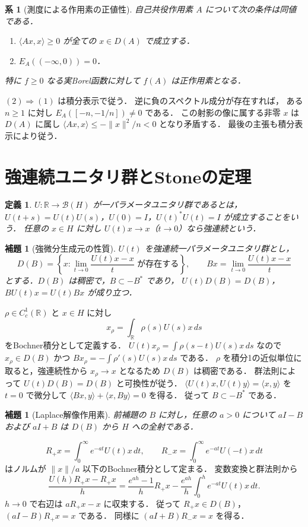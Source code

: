 \documentclass[a5paper,10pt,onecolumn]{jsarticle}
\makeatletter
\theoremstyle{mathnotetheorem}
\newtheorem{definition}[theorem]{定義}
\newtheorem{lemma}[theorem]{補題}
\newtheorem{corollary}[theorem]{系}
\renewcommand{\proofname}{証明}
\renewenvironment{proof}[1][\proofname]{%
  \par\pushQED{\qed}\normalfont\topsep4\p@\@plus2\p@\relax
  \trivlist\item[\hskip\labelsep\bfseries #1]\ignorespaces
}{\popQED\endtrivlist\@endpefalse}
\newcommand{\norm}[1]{\lVert #1\rVert}
\makeatother
\begin{document}
\begin{corollary}[測度による作用素の正値性]
自己共役作用素 $A$ について次の条件は同値である．
\begin{enumerate}
 \item $\langle Ax,x\rangle\ge0$ が全ての $x\in D(A)$ で成立する．
 \item $E_A(( -\infty,0))=0$．
\end{enumerate}
特に $f\ge0$ なる実Borel函数に対して $f(A)$ は正作用素となる．
\end{corollary}
\begin{proof}
$(2)\Rightarrow(1)$ は積分表示で従う．
逆に負のスペクトル成分が存在すれば，
ある $n\ge1$ に対し $E_A([-n,-1/n])\ne0$ である．
この射影の像に属する非零 $x$ は $D(A)$ に属し
$\langle Ax,x\rangle\le-\norm x^2/n<0$ となり矛盾する．
最後の主張も積分表示により従う．
\end{proof}

\section{強連続ユニタリ群とStoneの定理}
\begin{definition}
$U:\mathbb R\to\mathcal B(H)$ が一パラメータユニタリ群であるとは，
$U(t+s)=U(t)U(s)$，$U(0)=I$，$U(t)^*U(t)=I$ が成立することをいう．
任意の $x\in H$ に対し $U(t)x\to x$（$t\to0$）なら\emph{強連続}という．
\end{definition}

\begin{lemma}[強微分生成元の性質]
$U(t)$ を強連続一パラメータユニタリ群とし，
\[
 D(B)=\left\{x:\lim_{t\to0}\frac{U(t)x-x}{t}
                  \text{ が存在する}\right\},\qquad
 Bx=\lim_{t\to0}\frac{U(t)x-x}{t}
\]
とする．$D(B)$ は稠密で，$B\subset-B^*$ であり，
$U(t)D(B)=D(B)$，$BU(t)x=U(t)Bx$ が成り立つ．
\end{lemma}
\begin{proof}
$\rho\in C_c^1(\mathbb R)$ と $x\in H$ に対し
\[
 x_\rho=\int_{\mathbb R}\rho(s)U(s)x\,ds
\]
をBochner積分として定義する．
$U(t)x_\rho=\int\rho(s-t)U(s)x\,ds$ なので
$x_\rho\in D(B)$ かつ
$Bx_\rho=-\int\rho'(s)U(s)x\,ds$ である．
$\rho$ を積分1の近似単位に取ると，強連続性から
$x_\rho\to x$ となるため $D(B)$ は稠密である．
群法則によって $U(t)D(B)=D(B)$ と可換性が従う．
$\langle U(t)x,U(t)y\rangle=\langle x,y\rangle$ を
$t=0$ で微分して
$\langle Bx,y\rangle+\langle x,By\rangle=0$ を得る．
従って $B\subset-B^*$ である．
\end{proof}

\begin{lemma}[Laplace解像作用素]
前補題の $B$ に対し，任意の $a>0$ について
$aI-B$ および $aI+B$ は $D(B)$ から $H$ への全射である．
\end{lemma}
\begin{proof}
\[
 R_+x=\int_0^\infty e^{-at}U(t)x\,dt,\qquad
 R_-x=\int_0^\infty e^{-at}U(-t)x\,dt
\]
はノルムが $\norm x/a$ 以下のBochner積分として定まる．
変数変換と群法則から
\[
 \frac{U(h)R_+x-R_+x}{h}
 =\frac{e^{ah}-1}{h}R_+x
   -\frac{e^{ah}}h\int_0^h e^{-at}U(t)x\,dt.
\]
$h\to0$ で右辺は $aR_+x-x$ に収束する．
従って $R_+x\in D(B)$，$(aI-B)R_+x=x$ である．
同様に $(aI+B)R_-x=x$ を得る．
\end{proof}
\end{document}
